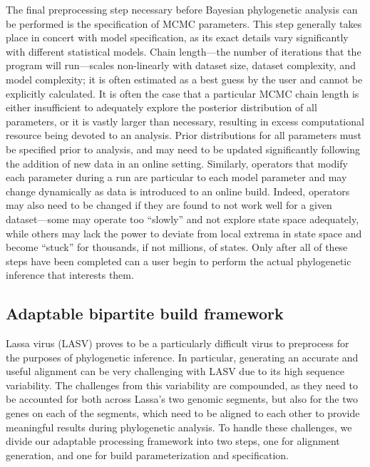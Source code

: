 The final preprocessing step necessary before Bayesian phylogenetic analysis can be performed is the specification of MCMC parameters.
This step generally takes place in concert with model specification, as its exact details vary significantly with different statistical models.
Chain length---the number of iterations that the program will run---scales non-linearly with dataset size, dataset complexity, and model complexity; it is often estimated as a best guess by the user and cannot be explicitly calculated.
It is often the case that a particular MCMC chain length is either insufficient to adequately explore the posterior distribution of all parameters, or it is vastly larger than necessary, resulting in excess computational resource being devoted to an analysis.
Prior distributions for all parameters must be specified prior to analysis, and may need to be updated significantly following the addition of new data in an online setting.
Similarly, operators that modify each parameter during a run are particular to each model parameter and may change dynamically as data is introduced to an online build.
Indeed, operators may also need to be changed if they are found to not work well for a given dataset---some may operate too ``slowly'' and not explore state space adequately, while others may lack the power to deviate from local extrema in state space and become ``stuck'' for thousands, if not millions, of states.
Only after all of these steps have been completed can a user begin to perform the actual phylogenetic inference that interests them.

\subsection{Adaptable bipartite build framework}

Lassa virus (LASV) proves to be a particularly difficult virus to preprocess for the purposes of phylogenetic inference.
In particular, generating an accurate and useful alignment can be very challenging with LASV due to its high sequence variability.
The challenges from this variability are compounded, as they need to be accounted for both across Lassa's two genomic segments, but also for the two genes on each of the segments, which need to be aligned to each other to provide meaningful results during phylogenetic analysis. %
To handle these challenges, we divide our adaptable processing framework into two steps, one for alignment generation, and one for build parameterization and specification.

